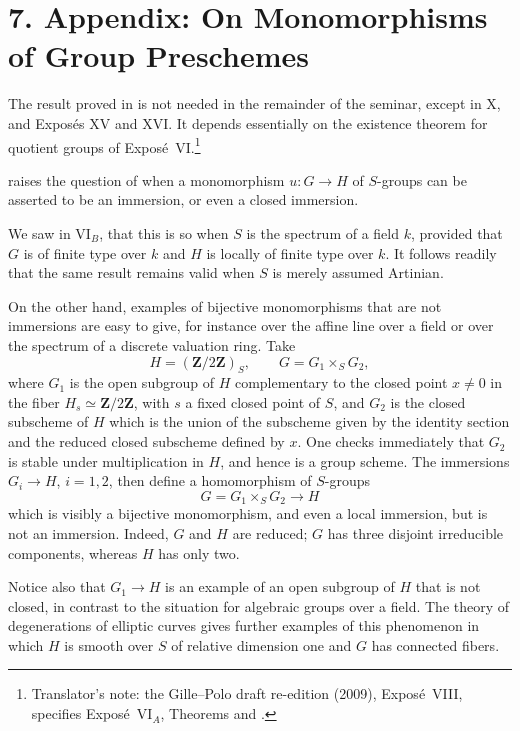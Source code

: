 
\section*{7. Appendix: On Monomorphisms of
Group Preschemes}

The result proved in  is not needed in the remainder of the
seminar, except in X,  and Expos\'es XV and XVI. It depends essentially
on the existence theorem for quotient groups of Expos\'e~VI.\footnote{Translator's note: the
Gille--Polo draft re-edition (2009), Expos\'e~VIII, specifies Expos\'e~VI\(_A\), Theorems
 and .}

 raises the question of when a monomorphism
\(u:G\to H\) of \(S\)-groups can be asserted to be an immersion, or even a
closed immersion.

We saw in VI\(_B\),  that this is so when \(S\) is the spectrum of a
field \(k\), provided that \(G\) is of finite type over \(k\) and \(H\) is
locally of finite type over \(k\). It follows readily that the same result
remains valid when \(S\) is merely assumed Artinian.

On the other hand, examples of bijective monomorphisms that are not
immersions are easy to give, for instance over the affine line over a field
or over the spectrum of a discrete valuation ring. Take
\[
  H=(\mathbf Z/2\mathbf Z)_S,\qquad G=G_1\times_SG_2,
\]
where \(G_1\) is the open subgroup of \(H\) complementary to the closed
point \(x\ne0\) in the fiber \(H_s\simeq\mathbf Z/2\mathbf Z\), with \(s\)
a fixed closed point of \(S\), and \(G_2\) is the closed subscheme of \(H\)
which is the union of the subscheme given by the identity section and the
reduced closed subscheme defined by \(x\). One checks immediately that
\(G_2\) is stable under multiplication in \(H\), and hence is a group
scheme. The immersions \(G_i\to H\), \(i=1,2\), then define a homomorphism
of \(S\)-groups
\[
  G=G_1\times_SG_2\longrightarrow H
\]
which is visibly a bijective monomorphism, and even a local immersion, but
is not an immersion. Indeed, \(G\) and \(H\) are reduced; \(G\) has three
disjoint irreducible components, whereas \(H\) has only two.

Notice also that \(G_1\to H\) is an example of an open subgroup of \(H\)
that is not closed, in contrast to the situation for algebraic groups over
a field. The theory of degenerations of elliptic curves gives further
examples of this phenomenon in which \(H\) is smooth over \(S\) of relative
dimension one and \(G\) has connected fibers.

